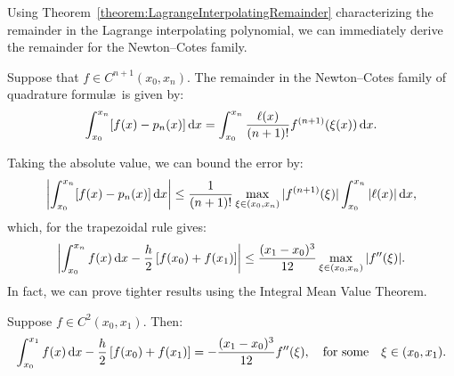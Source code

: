 Using Theorem~\ref{theorem:LagrangeInterpolatingRemainder} characterizing the remainder in the Lagrange interpolating polynomial, we can immediately derive the remainder for the Newton--Cotes family.
\begin{theorem}\label{theorem:NewtonCotesLIRError}
Suppose that $f\in C^{n+1}(x_0,x_n)$. The remainder in the Newton--Cotes family of quadrature formul\ae~is given by:
\begin{equation}
\int_{x_0}^{x_n}[f(x)-p_n(x)]{\rm\,d} x = \int_{x_0}^{x_n} \dfrac{\ell(x)}{(n+1)!}f^{(n+1)}(\xi(x)){\rm\,d} x.
\end{equation}
\end{theorem}
Taking the absolute value, we can bound the error by:
\[
\left|\int_{x_0}^{x_n}[f(x)-p_n(x)]{\rm\,d} x\right| \le \dfrac{1}{(n+1)!}\max_{\xi\in(x_0,x_n)}|f^{(n+1)}(\xi)|\int_{x_0}^{x_n} |\ell(x)|{\rm\,d} x,
\]
which, for the trapezoidal rule gives:
\[
\left|\int_{x_0}^{x_n}f(x)\ud x - \dfrac{h}{2}\br[f(x_0)+f(x_1)]\right| \le \dfrac{(x_1-x_0)^3}{12}\max_{\xi\in(x_0,x_n)}|f''(\xi)|.
\]
In fact, we can prove tighter results using the Integral Mean Value Theorem.
\begin{theorem}\label{theorem:TrapezoidalIMVTError}
Suppose $f\in C^2(x_0,x_1)$. Then:
\[
\int_{x_0}^{x_1}f(x)\ud x - \dfrac{h}{2}\br[f(x_0)+f(x_1)] = -\dfrac{(x_1-x_0)^3}{12}f''(\xi),\quad\hbox{for some}\quad \xi\in(x_0,x_1).
\]
\end{theorem}

